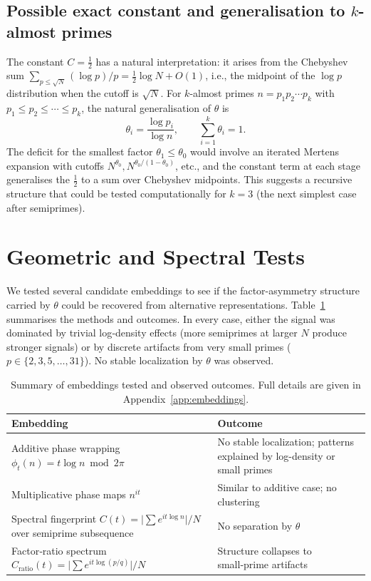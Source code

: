 \documentclass[11pt]{article}
\theoremstyle{definition}
\begin{document}
\subsection{Possible exact constant and generalisation to $k$-almost primes}
\label{sec:generalisation}

The constant \(C = \tfrac12\) has a natural interpretation: it arises from the
Chebyshev sum \(\sum_{p\le\sqrt N} (\log p)/p = \tfrac12\log N + O(1)\), i.e., the
midpoint of the \(\log p\) distribution when the cutoff is \(\sqrt N\).  For
\(k\)-almost primes \(n = p_1p_2\cdots p_k\) with \(p_1\le p_2\le\cdots\le p_k\), the
natural generalisation of \(\theta\) is
\[
\theta_i = \frac{\log p_i}{\log n},\qquad \sum_{i=1}^k\theta_i = 1.
\]
The deficit for the smallest factor \(\theta_1\le\theta_0\) would involve an iterated
Mertens expansion with cutoffs \(N^{\theta_0}, N^{\theta_0/(1-\theta_0)}\), etc., and
the constant term at each stage generalises the \(\tfrac12\) to a sum over
Chebyshev midpoints.  This suggests a recursive structure that could be tested
computationally for \(k=3\) (the next simplest case after semiprimes).

\section{Geometric and Spectral Tests}

We tested several candidate embeddings to see if the factor-asymmetry structure
carried by \(\theta\) could be recovered from alternative representations.
Table~\ref{tab:embeddings} summarises the methods and outcomes.  In every case,
either the signal was dominated by trivial log‑density effects (more semiprimes at
larger \(N\) produce stronger signals) or by discrete artifacts from very small
primes (\(p\in\{2,3,5,\dots,31\}\)).  No stable localization by \(\theta\) was observed.

\begin{table}[ht]
\centering
\caption{Summary of embeddings tested and observed outcomes.  Full details
  are given in Appendix~\ref{app:embeddings}.}
\label{tab:embeddings}
\begin{tabular}{p{4cm} p{8cm}}
\toprule
\textbf{Embedding} & \textbf{Outcome} \\
\midrule
Additive phase wrapping \(\phi_t(n)=t\log n\bmod 2\pi\) & No stable localization; patterns explained by log-density or small primes \\
Multiplicative phase maps \(n^{it}\) & Similar to additive case; no clustering \\
Spectral fingerprint \(C(t)=\bigl|\sum e^{it\log n}\bigr|/N\) over semiprime subsequence & No separation by \(\theta\) \\
Factor‑ratio spectrum \(C_{\mathrm{ratio}}(t)=\bigl|\sum e^{it\log(p/q)}\bigr|/N\) & Structure collapses to small‑prime artifacts \\
\hline
\end{tabular}
\end{table}
\end{document}
